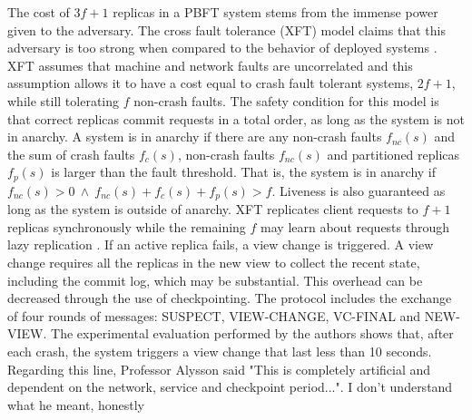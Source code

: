 The cost of $3f+1$ replicas in a PBFT system stems from the immense power given to the adversary. The cross fault tolerance (XFT) model claims that this adversary is too strong when compared to the behavior of deployed systems \cite{Liu2015}. XFT assumes that machine and network faults are uncorrelated and this assumption allows it to have a cost equal to crash fault tolerant systems, $2f+1$, while still tolerating $f$ non-crash faults. The safety condition for this model is that correct replicas commit requests in a total order, as long as the system is not in anarchy. A system is in anarchy if there are any non-crash faults $f_{nc}(s)$ and the sum of crash faults $f_c(s)$, non-crash faults $f_{nc}(s)$ and partitioned replicas $f_p(s)$ is larger than the fault threshold. That is, the system is in anarchy if $f_{nc}(s) > 0\ \land\ f_{nc}(s)+ f_c(s)+f_p(s) > f$. Liveness is also guaranteed as long as the system is outside of anarchy. XFT replicates client requests to $f+1$ replicas synchronously while the remaining $f$ may learn about requests through lazy replication \cite{Ladin1992}. If an active replica fails, a view change is triggered. A view change requires all the replicas in the new view to collect the recent state, including the commit log, which may be substantial. This overhead can be decreased through the use of checkpointing. The protocol includes the exchange of four rounds of messages: SUSPECT, VIEW-CHANGE, VC-FINAL and NEW-VIEW. The experimental evaluation performed by the authors shows that, after each crash, the system triggers a view change that last less than 10 seconds. {\color{red} Regarding this line, Professor Alysson said "This is completely artificial and dependent on the network, service and checkpoint period...". I don't understand what he meant, honestly} \par
